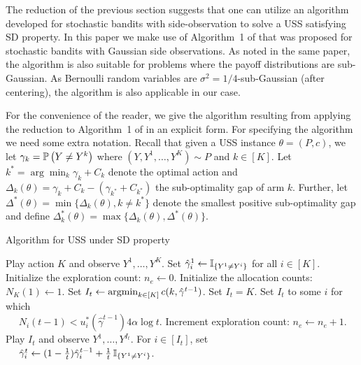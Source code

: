 \newcommand{\set}{\leftarrow}
\newcommand{\hgamma}{\hat{\gamma}}
The reduction of the previous section suggests that one can  utilize 
an algorithm developed for stochastic bandits with side-observation to solve a USS satisfying SD property.
In this paper we make use of Algorithm~1 of \cite{WGySz:NIPS15}
that was proposed for stochastic bandits with Gaussian side observations. 
As noted in the same paper, the algorithm is also suitable for problems where the payoff distributions are sub-Gaussian.
As Bernoulli random variables are $\sigma^2=1/4$-sub-Gaussian (after centering),
the algorithm is also applicable in our case.

For the convenience of the reader, we give the algorithm resulting from applying the reduction to Algorithm~1 
of \cite{WGySz:NIPS15} in an explicit form.
For specifying the algorithm we need some extra notation.
Recall that given a USS instance $\theta = (P,c)$, we let $\gamma_k = \mathbb{P}\left(Y\ne Y^k\right)$ where $(Y,Y^1,\dots,Y^K)\sim P$ and $k\in [K]$. Let $k^*=\arg\min_k \gamma_k +C_k$ denote the optimal action and $\Delta_k(\theta)=\gamma_k+C_k-(\gamma_{k^*}+C_{k^*})$ the sub-optimality gap of arm $k$. Further, let $\Delta^*(\theta) = \min\{\Delta_k(\theta), k\neq k^* \}$ denote the smallest positive sub-optimality gap and define $\Delta_k^*(\theta) =\max\{\Delta_k(\theta), \Delta^*(\theta)\}$.

\vspace{-.5cm}
\begin{center}
	\begin{minipage}{0.48\textwidth}
		\begin{algorithm}[H]
			\caption{Algorithm for USS under SD property} 
			\label{alg:asym}
			\begin{algorithmic}[1]
				\STATE Play action $K$ and observe  $Y^1,\dots,Y^K$.
				\STATE Set $\hgamma_{i}^1 \set \one{Y^1\ne Y^i}$ for all $i\in [K]$.
				\STATE Initialize the exploration count: $n_e \set 0$.
				\STATE Initialize the allocation counts: $N_K(1) \set 1$.
				\IF{$\frac{N(t-1)}{4\alpha \log t}\in C(\hgamma^{t-1})$} \label{alg:check}
				\STATE Set $I_t \set \argmin_{k\in [K]} c(k,\hgamma^{t-1})$. \label{alg:greedy}
				\ELSE
				 \label{alg:starve}
				\STATE Set $I_t =K$. \label{alg:forced}
				\ELSE
				\STATE Set $I_t$ to some $i$ for which \label{alg:plan} \\
				$\quad$ $N_i(t-1)< u_i^*(\hgamma^{t-1})4\alpha\log t$.
				\ENDIF
				\STATE Increment exploration count: $n_e \set n_e+1$.
				\ENDIF
				\STATE Play $I_t$ and observe  $Y^1,\dots,Y^{I_t}$.
				\STATE For $i\in [I_t]$, set\\
				$\quad$ $\hgamma_i^t \set (1-{1\over t}) \hgamma_i^{t-1} + {1\over t} \,\one{Y^1\ne Y^i}$.
				\ENDFOR
			\end{algorithmic}
		\end{algorithm}
	\end{minipage}
\end{center}

